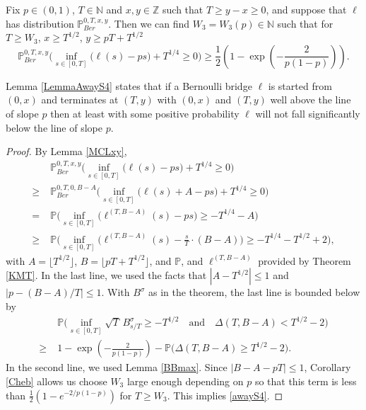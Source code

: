 \begin{lemma}\label{LemmaAwayS4} Fix $p \in (0,1)$, $T \in \mathbb{N}$ and $x, y\in \mathbb{Z}$ such that $T \geq y-x \geq 0$, and suppose that $\ell$ has distribution $\mathbb{P}^{0,T,x,y}_{Ber}$. Then we can find $W_3 = W_3(p) \in \mathbb{N}$ such that for $T \geq W_3$, $ x \geq T^{1/2}$, $ y \geq pT +  T^{1/2}$
\begin{equation}\label{awayS4}
\mathbb{P}^{0,T,x,y}_{Ber}\Big( \inf_{s \in [0,T]} \big( \ell(s) -ps \big)+ T^{1/4} \geq 0 \Big) \geq \frac{1}{2} \left(1 - \exp\left(-\frac{2}{p(1-p)}\right)\right).
\end{equation}
\end{lemma}
\begin{remark} 
Lemma \ref{LemmaAwayS4} states that  if a Bernoulli bridge $\ell$ is started from $(0,x)$ and terminates at $(T,y)$ with $(0,x)$ and $(T,y)$ well above the line of slope $p$ then at least with some positive probability $\ell$ will not fall significantly below the line of slope $p$.
\end{remark}
\begin{proof}
	By Lemma \ref{MCLxy},
	\begin{align*}
	& \mathbb{P}^{0,T,x,y}_{Ber}\Big( \inf_{s \in [0,T]} \big( \ell(s) -ps \big)+ T^{1/4} \geq 0 \Big) \\
	\geq \; & \mathbb{P}^{0,T,0,B-A}_{Ber}\Big( \inf_{s \in [0,T]} \big( \ell(s) + A -ps \big)+ T^{1/4} \geq 0 \Big)\\
	= \; & \mathbb{P}\Big( \inf_{s \in [0,T]} \big( \ell^{(T,B-A)}(s) -ps \big) \geq - T^{1/4} - A \Big)\\
	\geq \; & \mathbb{P}\Big( \inf_{s \in [0,T]} \big( \ell^{(T,B-A)}(s) - \frac{s}{T}\cdot(B-A) \big) \geq - T^{1/4} - T^{1/2} + 2 \Big),
	\end{align*}
	with $A = \lfloor T^{1/2}\rfloor$, $B = \lfloor pT + T^{1/2}\rfloor$, and $\mathbb{P}$, and $\ell^{(T,B-A)}$ provided by Theorem \ref{KMT}. In the last line, we used the facts that $|A-T^{1/2}|\leq 1$ and $|p-(B-A)/T|\leq 1$. With $B^\sigma$ as in the theorem, the last line is bounded below by
	\begin{align*}
	&\mathbb{P}\Big( \inf_{s\in[0,T]} \sqrt{T}\,B^\sigma_{s/T} \geq - T^{1/2} \quad \mathrm{and} \quad \Delta(T,B-A) < T^{1/2} - 2 \Big)\\
	\geq \; & 1- \exp\left(-\frac{2}{p(1-p)}\right) - \mathbb{P}\Big( \Delta(T,B-A) \geq T^{1/2} - 2 \Big).
	\end{align*}
	In the second line, we used Lemma \ref{BBmax}. Since $|B-A-pT| \leq 1$, Corollary \ref{Cheb} allows us choose $W_3$ large enough depending on $p$ so that this term is less than $\frac{1}{2}(1-e^{-2/p(1-p)})$ for $T\geq W_3$. This implies \eqref{awayS4}.
\end{proof}


